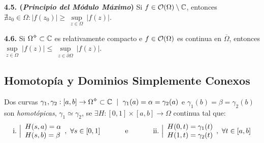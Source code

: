 
\hypertarget{thm345}{}
\begin{theorem}
    \textbf{4.5. (\emph{Principio del Módulo Máximo})} Si \(f \in \mathcal{O}(\Omega) \setminus \mathbb{C}\), entonces \(\nexists z_0 \in \Omega : |f(z_0)| \geq \ \underset{z \in \Omega}{\sup} \ |f(z)|\). 
\end{theorem}

\begin{corollary}
    \textbf{4.6.} Si \(\Omega\ab\subset \C\) es relativamente compacto e \(f \in \mathcal{O}(\Omega)\) es continua en \(\overline{\Omega}\), entonces \(\underset{z \in \Omega}{\sup} \ |f(z)| \leq \ \underset{z\in \partial \Omega}{\sup} \ |f(z)|\).    
\end{corollary}

\subsection*{Homotopía y Dominios Simplemente Conexos}

\begin{definition}
    Dos curvas \(\gamma_1, \gamma_2: [a,b] \to \Omega\ab \subset \C \ \mid \ \gamma_1(a) = \alpha = \gamma_2(a)\) e \(\gamma_1(b) = \beta = \gamma_2(b)\) son \emph{homotópicas}, \(\gamma_1 \simeq \gamma_2\), se \(\exists H : [0,1] \times [a,b] \to \Omega\) continua tal que:   
    \[\text{i.} \ \Big|\begin{array}{l}
    H(s,a) = \alpha\\ 
    H(s,b) = \beta
    \end{array}, \ \forall s \in [0,1] \text{ \hspace{1cm} e \hspace{1cm} } \text{ii.} \ \Big| \begin{array}{l}
        H(0,t) = \gamma_1(t)\\ 
        H(1,t) = \gamma_2(t)
    \end{array}, \ \forall t \in [a,b]\]
\end{definition}

